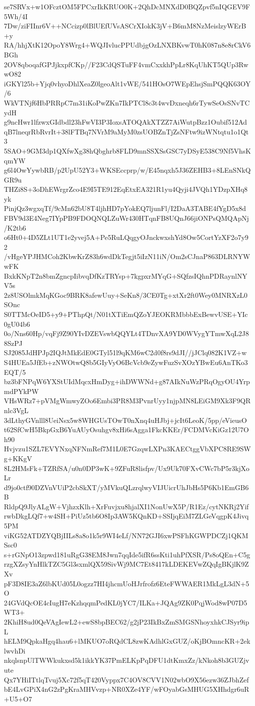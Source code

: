 se7SRVx+w1OFcztOM5FPCxrIkKRUO0K+2QhDcMNXdD0BQZpvf5nIQGEV9F5Wh/4I
7Dw/ziFIInr6V++NCcizp0lBlUEfUVsASCrXIokK3jV+B6mM8NzMeislzyWErB+y
RA/hhjXtK12OpoY8Wrg4+WQJIvlucPPUdbjgOzLNXBKvwT0hK087n8e8rCkV6BGh
2OV8qboqafGPJjkxpfCKp//F23CdQSTuFF4vmCxxkhPpLr8KqUhKT5QUp3RwwO82
iGKYl25b+Yjq0vhyoDhlXeaZ0lgeoAlt1vWE/541HOsO7WEpEhsjSmPQQK63OY/6
WkVTNjf6HbPRRpC7m31iKoPwZKn7IkPTCl8c3t4wvDxneqh6rTywSeOsSNvTCydH
g9ncHwr1lfzwxGIdbdl23hFwVI3P3IoxsATOQAkXTZZ7AiWutpBzz1Oubif512Ad
qB7lneqrRbRvrIt+38lFTBq7NVrM9aMyM0zsUOBZnTjZsNFtw9izWNtqtu1o1Qt3
5SAO+9GM3dp1QXfwXg38hQbghrb8FLD9mnSSXSsGSC7yDSyE538C9Nf5VhsKqmYW
g6l4OwYywbRB/p2UpU52Y3+WKSEccprp/w/E45nqxh5J36ZEHB3+8LEnSNkQGR9u
THZi8S+3oDhEWrgrZco4E9I5TE912EqEtxEA321R1yu4Qyji4JVQh1YDzpXHq8yk
PinjQz3wgxqTf/9cMn62bU8T4ljhHD7pYokEQ7ljunFl/I2DaA3TABE4fYgD5x8d
FBV9d3E4Neg7IYpPB9FDOQNQLZuWr430HTqnFB8UQnJ66jiONPsQMQApNj/K2tb6
o6Ht0+4D5ZLt1UT1e2yvej5A+Pe5RuLQqgyOJnckwxshYd8Ow5CortYzXF2o7y92
/vHgeYPJHMCoh2KbwKrZ83h6wdDkTegjt5iIzN11iN/Om2sCJnaP863DLRNYWwFK
BxkKNpT2n8bmZgncpIibvqDfKzTRYsp+7kgpxrMYqG+SQfzsIQhnPDRaynlNYV5s
2z8USOlmkMqKGoc9BRK8afewUuy+SeKn8/3CE0Tg+xtXr2ft0Wey0MNRXzL0SOnc
S0TTMcOeID5+y9+PThpQt/N01tXTiEmQZoYJEOKRMbbbExBewvUSE+YIc0gU04b6
0o/Nns60Hp/vqFj9Z90YIvDZEVswbQQYLt4TDnvXA9YD0WVygYTmwXqL2J88SzPJ
SJ2085JdHPJp2IQJtMkEdE0GTyl51l9qKM6wC2d0f8rs9dJI//jJClq082K1VZ+w
S4HUEa5JfEb+zNWOtwQ8b5GIyVyO6BcVcb9eZywFuzSvXOzYBwEu6AnTKo3EQT/5
bz3bFNPqW6YXStUIdMqcxHmDyg+ihDWWNd+g87AIkNuWzPRqOgyOU4YrpmdPYkPW
VHsWRz7+pVMgWmwyZOo6Embi3PR8M3PvnrUyy1njpMN8LEiGM9Xk3F9QRnlc3VgL
3dLthyGVnlll8UeiNsx5w8WHGUsTOwT0nXnq4uHJbj+jcIt6LeoK/5pp/eVieusO
t62SfCwH5BkpGxB6YuAUyOsuhgv8xHi6sAgga1FkcKKEr/FCDMVcKiGz12U7Oh90
Hvjvzu1SZL7EVYNxqNFNmRef7M1L0E7GzqwLXPn3KAECtggVbXPC8RE9SWg+KKgV
8L2HMsFk+TZRfSA/u0n0DP3wK+9ZFuR8lisfpv/Ux9Uk70FXvCWc7bP5r3kjXoLr
d9jo0ctf90DZVnVUiP2cbSkXT/yMVkuQLzrqlwyVIJUicrUhJbHs5P6Kb1EmGB6B
RldpQ9JlyALgW+VjhzxKlh+XrFuvjxu8hjalXI1NonUwX5P/R1Ez/cytNKRj2Yif
rwbDkgLQf7+w4SH+PiUz5tb6O8Ip3AW5KQnKD+SSIjqEiM7ZLGeVqgpK4Jivq5PM
viKG52ATDZYQBjIILs8a8o1k5r9WI4eLf/NN72GJI6xwPSFhKGWPDCZj1QKMSsc0
s+rGNpO13zpwd181uRgG38EM8Jwn7qqIde5ifR6ssKti1uhPfXSR/Ps8oQEn+C5g
rzgXZsyYnHlkTZC5Gl3sxmlQX59SivWj9MC7Et8417kLDEKEVwZQqIgBKjlK9ZXv
pF3D8IE3aZ6lbKUd05L0ogzz7HI4jhcmUoHJrfrofz6EteFWWAER1MkLgL3dN+5O
24GVdQcOE4cIugH7eKzhqqmPedKL0jYC7/ILKa+JQAg9ZK0PqjWod8wP07D5WT3+
2KhiH8ud0QeVAgIewL2+ewS8bpBEC62/g2jP23IkBxZmSMGSNhoyxhkCJSyr9ipL
hELM9QpkaHgq4hau6+lMKUO7oRQdCL8zwKAdhlGxGUZ/oKjBOmncKR+2eklwvhDi
nkqlsnpUlTWWkukxsd5k1ikkYK37PmELKpPqDFU1dtKmxZz/kNkoh8b3GUZjvute
Qx7YHiITtlqTvuj5Xc72f5qT420Vyppx7C4OV8CVV1N02wbO9X56ezw36ZJbhZef
bE4LvGPiX4nG2zPgKraMHVvzp+NR0XZe4YF/wFOyabGsMHUG5XHhdgr6uR+U5+O7
